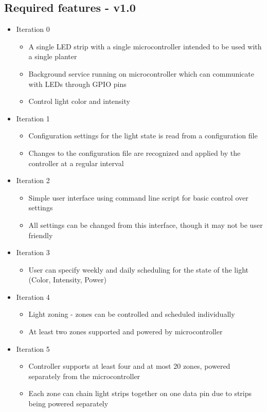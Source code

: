 \documentclass[onecolumn, draftclsnofoot,10pt, compsoc]{IEEEtran}
\begin{document}
		\subsection{Required features - v1.0}
			\begin{itemize}
				\item Iteration 0
						\begin{itemize}
						\item A single LED strip with a single microcontroller intended to be used with a single planter
						\item Background service running on microcontroller which can communicate with LEDs through GPIO pins
						\item Control light color and intensity
					\end{itemize}
						\item Iteration 1
					\begin{itemize}
						\item Configuration settings for the light state is read from a configuration file
						\item Changes to the configuration file are recognized and applied by the controller at a regular interval
					\end{itemize}

				\item Iteration 2
					\begin{itemize}
						\item Simple user interface using command line script for basic control over settings
						\item All settings can be changed from this interface, though it may not be user friendly
					\end{itemize}
				\item Iteration 3
					\begin{itemize}
						\item User can specify weekly and daily scheduling for the state of the light (Color, Intensity, Power)
					\end{itemize}
				\item Iteration 4
					\begin{itemize}
						\item Light zoning - zones can be controlled and scheduled individually
						\item At least two zones supported and powered by microcontroller
					\end{itemize}
				\item Iteration 5
					\begin{itemize}
						\item Controller supports at least four and at most 20 zones, powered separately from the microcontroller
						\item Each zone can chain light strips together on one data pin due to strips being powered separately
					\end{itemize}
			\end{itemize}
\end{document}
